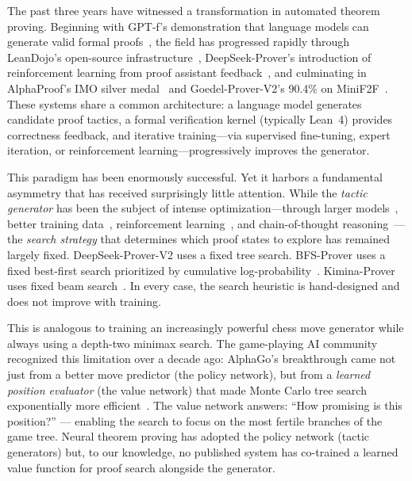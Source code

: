 \documentclass{article}
\begin{document}
The past three years have witnessed a transformation in automated theorem proving. Beginning with GPT-f's demonstration that language models can generate valid formal proofs~\citep{polu2020generative}, the field has progressed rapidly through LeanDojo's open-source infrastructure~\citep{yang2023leandojo}, DeepSeek-Prover's introduction of reinforcement learning from proof assistant feedback~\citep{xin2024deepseekprover15}, and culminating in AlphaProof's IMO silver medal~\citep{alphaproof2025} and Goedel-Prover-V2's 90.4\% on MiniF2F~\citep{lin2025goedelv2}. These systems share a common architecture: a language model generates candidate proof tactics, a formal verification kernel (typically Lean~4) provides correctness feedback, and iterative training---via supervised fine-tuning, expert iteration, or reinforcement learning---progressively improves the generator.

This paradigm has been enormously successful. Yet it harbors a fundamental asymmetry that has received surprisingly little attention. While the \emph{tactic generator} has been the subject of intense optimization---through larger models~\citep{wang2025kimina}, better training data~\citep{lin2025goedelv2}, reinforcement learning~\citep{xin2024deepseekprover15, ren2025deepseekv2}, and chain-of-thought reasoning~\citep{lin2024leanstar}---the \emph{search strategy} that determines which proof states to explore has remained largely fixed. DeepSeek-Prover-V2 uses a fixed tree search. BFS-Prover uses a fixed best-first search prioritized by cumulative log-probability~\citep{xin2025bfsprover}. Kimina-Prover uses fixed beam search~\citep{wang2025kimina}. In every case, the search heuristic is hand-designed and does not improve with training.

This is analogous to training an increasingly powerful chess move generator while always using a depth-two minimax search. The game-playing AI community recognized this limitation over a decade ago: AlphaGo's breakthrough came not just from a better move predictor (the policy network), but from a \emph{learned position evaluator} (the value network) that made Monte Carlo tree search exponentially more efficient~\citep{silver2016mastering, silver2017alphazero}. The value network answers: ``How promising is this position?'' --- enabling the search to focus on the most fertile branches of the game tree. Neural theorem proving has adopted the policy network (tactic generators) but, to our knowledge, no published system has co-trained a learned value function for proof search alongside the generator.
\end{document}

